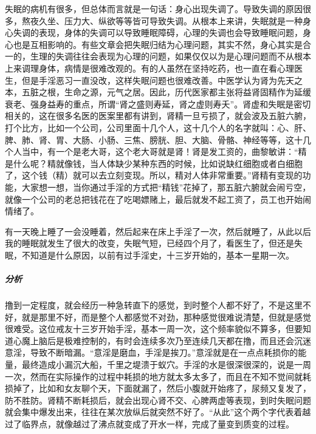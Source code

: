 失眠的病机有很多，但总体而言就是一句话：身心出现失调了。导致失调的原因很多，熬夜久坐、压力大、纵欲等等皆可导致失调。从根本上来讲，失眠就是一种身心失调的表现，身体的失调可以导致睡眠障碍，心理的失调也会导致睡眠问题，身心也是互相影响的。有些文章会把失眠归结为心理问题，其实不然，身心其实是合一的，生理的失调往往会表现为心理的问题，如果仅仅以为是心理问题而不从根本上来调理身体，病情是很难改观的。有的人虽然在坚持吃药，也一直在看心理医生，但是手淫恶习一直没改，这样失眠问题也很难改善。中医学认为肾为先天之本，五脏之根，生命之源，元气之居。因此，历代医家都主张将益肾固精作为延缓衰老、强身益寿的重点，所谓“肾之盛则寿延，肾之虚则寿夭”。肾虚和失眠是密切相关的，这在很多名医的医案里都有讲到，肾精一旦亏损了，就会波及五脏六腑，打个比方，比如一个公司，公司里面十几个人，这十几个人的名字就叫：心、肝、脾、肺、肾、胃、大肠、小肠、三焦、膀胱、胆、大脑、骨骼、神经等等，这十几个人当中，有一个是老大哥，这个老大哥就是肾！肾是发工资的，曲黎敏讲：“精是什么呢？精就像钱，当人体缺少某种东西的时候，比如说缺红细胞或者白细胞了，这个钱（精）就可以去立刻变现。所以，精对人体非常重要。”肾精有变现的功能，大家想一想，当你通过手淫的方式把“精钱”花掉了，那五脏六腑就会闹亏空，就像一个公司的老总把钱花在了吃喝嫖赌上，最后就发不起工资了，员工也开始闹情绪了。

\begin{case}
    有一天晚上睡了一会没睡着，然后起来在床上手淫了一次，然后就睡了，从此以后我的睡眠就发生了很大的改变，失眠气短，已经四个月了，看医生了，但还是失眠，不知道是什么原因，以前有过手淫史，十三岁开始的，基本一星期一次。
    \subparagraph{分析} 撸到一定程度，就会经历一种急转直下的感觉，到时整个人都不好了，不是这里不好，就是那里不好，而是整个人都感觉不对劲，那种感觉很难说清楚，但就是感觉很难受。这位戒友十三岁开始手淫，基本一周一次，这个频率貌似不算多，但要知道心魔上脑后是极难控制的，有时会连续多次乃至连续几天都在撸，而且还会沉迷意淫，导致不断暗漏。“意淫是磨血，手淫是挨刀。”意淫就是在一点点耗损你的能量，最终造成小漏沉大船，千里之堤溃于蚁穴。手淫的水是很深很深的，说是一周一次，然而在实际操作的过程中耗损的地方就太多太多了，而且在不知不觉间就耗损掉了，比如和女友聊个天，下面就漏了，然后小腹就开始疼了，尿频又复发了，防不胜防。肾精不断耗损后，就会出现心肾不交、心脾两虚等表现，到时失眠问题就会集中爆发出来，往往在某次放纵后就突然不好了。“从此”这个两个字代表着越过了临界点，就像越过了沸点就变成了开水一样，完成了量变到质变的过程。
\end{case}

